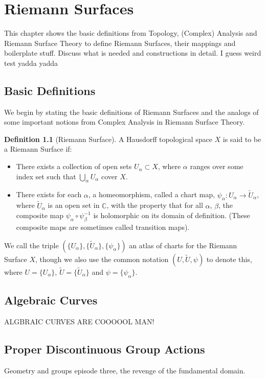 \documentclass[a4paper,12pt]{report}
\theoremstyle{plain}
\theoremstyle{definition}
\newtheorem{defn}[thm]{Definition}
\begin{document}
\chapter{Riemann Surfaces}

This chapter shows the basic definitions from Topology, (Complex) Analysis 
and Riemann Surface Theory to define Riemann Surfaces, their mappings and 
boilerplate stuff. Discuss what is needed and constructions in detail.
I guess weird test yadda yadda 


\section{Basic Definitions}\label{bdefns}

We begin by stating the basic definitions of Riemann Surfaces and the 
analogs of some important notions from Complex Analysis in Riemann Surface
Theory.

\begin{defn}[Riemann Surface]\label{rsdefn}
A Hausdorff topological space $X$ is said to be a Riemann Surface if:
\begin{itemize}
\item There exists a collection of open sets $U_{\alpha} \subset X$, where $
\alpha$ 
ranges over some index set such that $\bigcup\limits_{\alpha} U_{\alpha}$ cover 
$X$.
\item There exists for each $\alpha$, a homeomorphism, called a chart map, $
\psi_{\alpha}\colon U_{\alpha} \rightarrow \tilde{U}_{\alpha}$, where $\tilde{U}
_{\alpha}$ is 
an open set in $\mathbb{C}$, with the property that for all $\alpha$, $\beta$, 
the 
composite map $\psi_{\alpha} \circ \psi_{\beta}^{-1}$ is holomorphic on its 
domain of 
definition. (These composite maps are sometimes called transition maps).
\end{itemize}
We call the triple $(\{U_\alpha\},\{\tilde{U}_{\alpha}\}, \{\psi_\alpha\})$ an 
atlas of 
charts for the Riemann Surface $X$, though we also use the common notation $(U,
\tilde{U}, \psi)$ to denote this, where $U=\{U_\alpha\}$, $\tilde{U}=\{\tilde{U}
_{\alpha}\}$ and $\psi=\{\psi_\alpha\}$.
\end{defn}


\section{Algebraic Curves}\label{algcurv}
ALGBRAIC CURVES ARE COOOOOL MAN!

\section{Proper Discontinuous Group Actions}\label{PropDiscGrpAct}
Geometry and groups episode three, the revenge of the fundamental domain.
\end{document}
